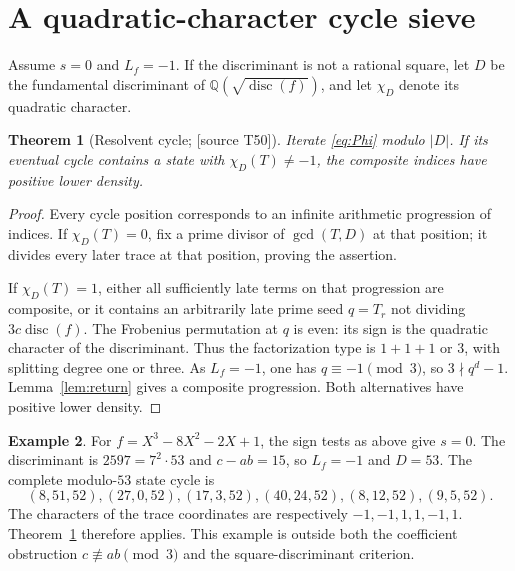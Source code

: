 \documentclass[11pt,a4paper]{article}
\newtheorem{theorem}{Theorem}[section]
\theoremstyle{definition}\newtheorem{definition}[theorem]{Definition}
\newtheorem{example}[theorem]{Example}
\theoremstyle{remark}\newtheorem{remark}[theorem]{Remark}
\newcommand{\Q}{\mathbb Q}\newcommand{\Z}{\mathbb Z}\newcommand{\N}{\mathbb N}\newcommand{\R}{\mathbb R}\newcommand{\C}{\mathbb C}
\newcommand{\sourceT}[1]{\textup{[source T#1]}}
\begin{document}
\section{A quadratic-character cycle sieve}
Assume $s=0$ and $L_f=-1$. If the discriminant is not a rational square, let $D$ be the fundamental discriminant of $\Q(\sqrt{\operatorname{disc}(f)})$, and let $\chi_D$ denote its quadratic character.
\begin{theorem}[Resolvent cycle; \sourceT{50}]\label{thm:resolvent}
Iterate \eqref{eq:Phi} modulo $|D|$. If its eventual cycle contains a state with $\chi_D(T)\ne-1$, the composite indices have positive lower density.
\end{theorem}
\begin{proof}
Every cycle position corresponds to an infinite arithmetic progression of indices. If $\chi_D(T)=0$, fix a prime divisor of $\gcd(T,D)$ at that position; it divides every later trace at that position, proving the assertion.

If $\chi_D(T)=1$, either all sufficiently late terms on that progression are composite, or it contains an arbitrarily late prime seed $q=T_r$ not dividing $3c\operatorname{disc}(f)$. The Frobenius permutation at $q$ is even: its sign is the quadratic character of the discriminant. Thus the factorization type is $1+1+1$ or $3$, with splitting degree one or three. As $L_f=-1$, one has $q\equiv-1\pmod3$, so $3\nmid q^d-1$. Lemma~\ref{lem:return} gives a composite progression. Both alternatives have positive lower density.
\end{proof}
\begin{example}
For $f=X^3-8X^2-2X+1$, the sign tests as above give $s=0$. The discriminant is $2597=7^2\cdot53$ and $c-ab=15$, so $L_f=-1$ and $D=53$. The complete modulo-$53$ state cycle is
\[
 (8,51,52),(27,0,52),(17,3,52),(40,24,52),(8,12,52),(9,5,52).
\]
The characters of the trace coordinates are respectively $-1,-1,1,1,-1,1$. Theorem~\ref{thm:resolvent} therefore applies. This example is outside both the coefficient obstruction $c\not\equiv ab\pmod3$ and the square-discriminant criterion.
\end{example}
\end{document}
